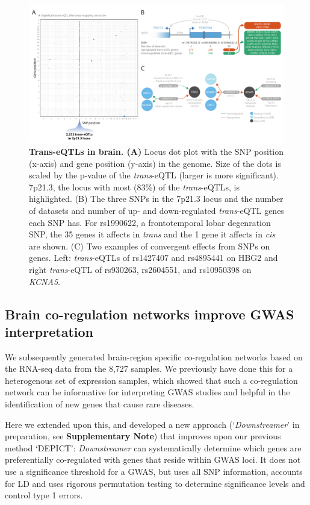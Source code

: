 \begin{figure}[H]
	\includegraphics[width=\textwidth]{chapters/chapter5-brain-eqtls/img/2021-02-11-fig6-trans-eQTLs-v2.pdf}
	\caption{\textbf{Trans-eQTLs in brain. (A)} Locus dot plot with the SNP position (x-axis) and gene position (y-axis) in the genome. Size of the dots is scaled by the p-value of the \emph{trans}-eQTL (larger is more significant). 7p21.3, the locus with most (83\%) of the \emph{trans}-eQTLs, is highlighted. (B) The three SNPs in the 7p21.3 locus and the number of datasets and number of up- and down-regulated \emph{trans}-eQTL genes each SNP has. For rs1990622, a frontotemporal lobar degenration SNP, the 35 genes it affects in \emph{trans}  and the 1 gene it affects in \emph{cis} are shown.  (C) Two examples of convergent effects from SNPs on genes. Left: \emph{trans}-eQTLs of rs1427407 and rs4895441 on HBG2 and right \emph{trans}-eQTL of rs930263, rs2604551, and rs10950398 on \emph{KCNA5}.}
	\label{metabrain_fig6}
\end{figure}

\subsection{Brain co-regulation networks improve GWAS interpretation}
We subsequently generated brain-region specific co-regulation networks based on the RNA-seq data from the 8,727 samples. We previously have done this for a heterogenous set of expression samples\cite{persBiologicalInterpretationGenomewide2015,deelenImprovingDiagnosticYield2019}, which showed that such a co-regulation network can be informative for interpreting GWAS studies\cite{persBiologicalInterpretationGenomewide2015} and helpful in the identification of new genes that cause rare diseases\cite{deelenImprovingDiagnosticYield2019}. 

Here we extended upon this, and developed a new approach (‘\emph{Downstreamer}’ in preparation, see \textbf{Supplementary Note}) that improves upon our previous method ‘DEPICT’\cite{persBiologicalInterpretationGenomewide2015}: \emph{Downstreamer} can systematically determine which genes are preferentially co-regulated with genes that reside within GWAS loci. It does not use a significance threshold for a GWAS, but uses all SNP information, accounts for LD and uses rigorous permutation testing to determine significance levels and control type 1 errors. 


